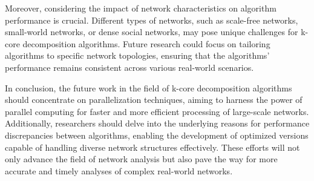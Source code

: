 Moreover, considering the impact of network characteristics on algorithm performance is crucial. Different types of networks, such as scale-free networks, small-world networks, or dense social networks, may pose unique challenges for k-core decomposition algorithms. Future research could focus on tailoring algorithms to specific network topologies, ensuring that the algorithms' performance remains consistent across various real-world scenarios.

In conclusion, the future work in the field of k-core decomposition algorithms should concentrate on parallelization techniques, aiming to harness the power of parallel computing for faster and more efficient processing of large-scale networks. Additionally, researchers should delve into the underlying reasons for performance discrepancies between algorithms, enabling the development of optimized versions capable of handling diverse network structures effectively. These efforts will not only advance the field of network analysis but also pave the way for more accurate and timely analyses of complex real-world networks.
